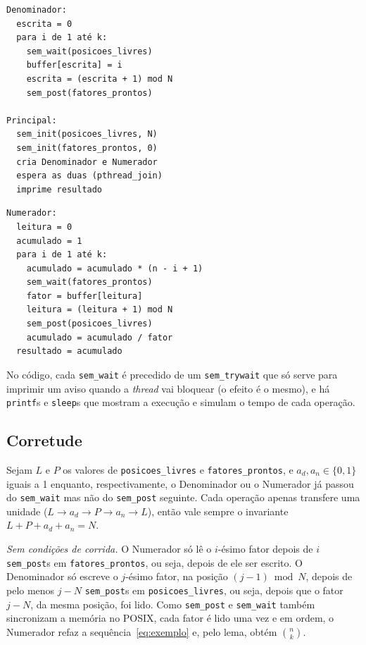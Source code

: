 \documentclass[a4paper, 12pt]{article}
\begin{document}
\noindent
\begin{minipage}[t]{0.48\textwidth}
\begin{lstlisting}[language={}, numbers=none, basicstyle=\ttfamily\scriptsize]
Denominador:
  escrita = 0
  para i de 1 até k:
    sem_wait(posicoes_livres)
    buffer[escrita] = i
    escrita = (escrita + 1) mod N
    sem_post(fatores_prontos)

Principal:
  sem_init(posicoes_livres, N)
  sem_init(fatores_prontos, 0)
  cria Denominador e Numerador
  espera as duas (pthread_join)
  imprime resultado
\end{lstlisting}
\end{minipage}\hfill
\begin{minipage}[t]{0.48\textwidth}
\begin{lstlisting}[language={}, numbers=none, basicstyle=\ttfamily\scriptsize]
Numerador:
  leitura = 0
  acumulado = 1
  para i de 1 até k:
    acumulado = acumulado * (n - i + 1)
    sem_wait(fatores_prontos)
    fator = buffer[leitura]
    leitura = (leitura + 1) mod N
    sem_post(posicoes_livres)
    acumulado = acumulado / fator
  resultado = acumulado
\end{lstlisting}
\end{minipage}

\medskip
No código, cada \texttt{sem\_wait} é precedido de um \texttt{sem\_trywait}
que só serve para imprimir um aviso quando a \emph{thread} vai bloquear (o
efeito é o mesmo), e há \texttt{printf}s e \texttt{sleep}s que mostram a
execução e simulam o tempo de cada operação.


\subsection{Corretude}

Sejam $L$ e $P$ os valores de \texttt{posicoes\_livres} e
\texttt{fatores\_prontos}, e $a_d, a_n \in \{0,1\}$ iguais a 1 enquanto,
respectivamente, o Denominador ou o Numerador já passou do
\texttt{sem\_wait} mas não do \texttt{sem\_post} seguinte. Cada operação
apenas transfere uma unidade ($L \to a_d \to P \to a_n \to L$), então vale
sempre o invariante $L + P + a_d + a_n = N$.

\emph{Sem condições de corrida.} O Numerador só lê o $i$-ésimo fator depois
de $i$ \texttt{sem\_post}s em \texttt{fatores\_prontos}, ou seja, depois de
ele ser escrito. O Denominador só escreve o $j$-ésimo fator, na posição
$(j-1) \bmod N$, depois de pelo menos $j - N$ \texttt{sem\_post}s em
\texttt{posicoes\_livres}, ou seja, depois que o fator $j - N$, da mesma
posição, foi lido. Como \texttt{sem\_post} e \texttt{sem\_wait} também
sincronizam a memória no POSIX, cada fator é lido uma vez e em ordem, o
Numerador refaz a sequência~\eqref{eq:exemplo} e, pelo lema, obtém
$\binom{n}{k}$.
\end{document}
